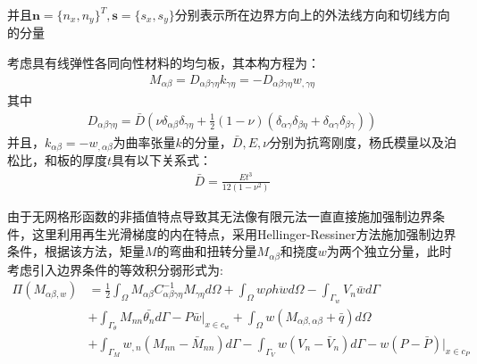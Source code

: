 \documentclass[11pt,a4paper]{article}
\begin{document}
并且$\pmb{n}=\{n_x,n_y\}^T,\pmb{s}=\{s_x,s_y\}$分别表示所在边界方向上的外法线方向和切线方向的分量\par
考虑具有线弹性各同向性材料的均匀板，其本构方程为：
\begin{equation}
    \begin{split}
    M_{\alpha\beta}=D_{\alpha\beta\gamma\eta}k_{\gamma\eta}=-D_{\alpha\beta\gamma\eta}w_{,\gamma\eta}
    \end{split}
    \end{equation}
其中
\begin{equation}
    \begin{split}
    D_{\alpha\beta\gamma\eta}=\bar D(\nu\delta_{\alpha\beta}\delta_{\gamma\eta}+\frac{1}{2}(1-\nu)(\delta_{\alpha\gamma}\delta_{\beta\eta}+\delta_{\alpha\gamma}\delta_{\beta\gamma}))
    \end{split}
    \end{equation}
并且，$k_{\alpha\beta}=-w_{,\alpha\beta}$为曲率张量$k$的分量，$\bar{D},E,\nu$分别为抗弯刚度，杨氏模量以及泊松比，和板的厚度$t$具有以下关系式：
\begin{equation}
    \begin{split}
    \bar D=\frac{Et^3}{12(1-\nu^2)}
    \end{split}
    \end{equation}\par
由于无网格形函数的非插值特点导致其无法像有限元法一直直接施加强制边界条件，这里利用再生光滑梯度的内在特点，采用Hellinger-Ressiner方法施加强制边界条件，根据该方法，矩量$M$的弯曲和扭转分量$M_{\alpha\beta}$和挠度$w$为两个独立分量，此时考虑引入边界条件的等效积分弱形式为:
\begin{equation}
    \begin{split}
        \Pi(M_{\alpha\beta,w})&=\frac{1}{2}\int_{\Omega}M_{\alpha\beta}C^{-1}_{\alpha\beta\gamma\eta}M_{\gamma\eta}d\Omega+\int_{\Omega} w\rho h\ddot{w}d\Omega-\int_{\Gamma_w}V_n\bar{w}d\Gamma\\
        &+\int_{\Gamma_{\theta}}M_{nn}\bar{\theta_n}d\Gamma-P\bar{w}\vert_{x\in c_w} +\int_{\Omega}w(M_{\alpha\beta,\alpha\beta}+\bar q)d\Omega\\
        &+\int_{\Gamma_M}w_{,n}(M_{nn}-\bar{M}_{nn})d\Gamma-\int_{\Gamma_V}w(V_n-\bar{V}_n)d\Gamma-w(P-\bar P)\vert_{x\in c_P}
    \end{split}
    \end{equation}
\end{document}
